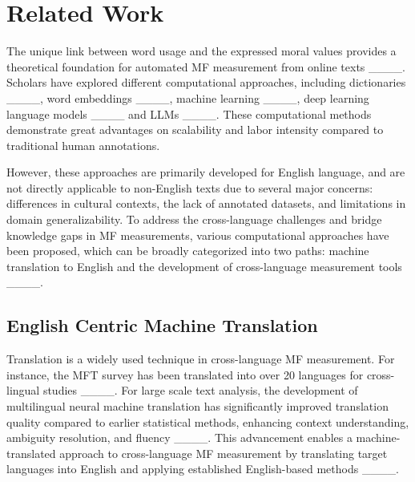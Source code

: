 \section{Related Work}
The unique link between word usage and the expressed moral values provides a theoretical foundation for automated MF measurement from online texts ____. Scholars have explored different computational approaches, including dictionaries ____, word embeddings ____, machine learning ____, deep learning language models ____ and LLMs ____. These computational methods demonstrate great advantages on scalability and labor intensity compared to traditional human annotations. 

However, these approaches are primarily developed for English language, and are not directly applicable to non-English texts due to several major concerns: differences in cultural contexts, the lack of annotated datasets, and limitations in domain generalizability. To address the cross-language challenges and bridge knowledge gaps in MF measurements, various computational approaches have been proposed, which can be broadly categorized into two paths: machine translation to English and the development of cross-language measurement tools ____. 

\subsection{English Centric Machine Translation}
Translation is a widely used technique in cross-language MF measurement. For instance, the MFT survey has been translated into over 20 languages for cross-lingual studies ____. For large scale text analysis, the development of multilingual neural machine translation has significantly improved translation quality compared to earlier statistical methods, enhancing context understanding, ambiguity resolution, and fluency ____. This advancement enables a machine-translated approach to cross-language MF measurement by translating target languages into English and applying established English-based methods ____.


